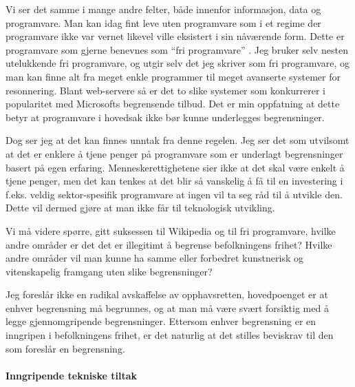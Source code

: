 \documentclass[11pt,norsk,a4paper]{article}
\begin{document}
Vi ser det samme i mange andre felter, både innenfor informasjon, data
og programvare. Man kan idag fint leve uten programvare som i et
regime der programvare ikke var vernet likevel ville eksistert i sin
nåværende form. Dette er programvare som gjerne benevnes som ``fri
programvare'' . Jeg bruker selv nesten utelukkende fri programvare, og
utgir selv det jeg skriver som fri programvare, og man kan finne alt
fra meget enkle programmer til meget avanserte systemer for
resonnering. Blant web-servere så er det to slike systemer som
konkurrerer i popularitet med Microsofts begrensende
tilbud\cite{netcraft}. Det er min oppfatning at dette betyr at
programvare i hovedsak ikke bør kunne underlegges begrensninger.

Dog ser jeg at det kan finnes unntak fra denne regelen. Jeg ser det
som utvilsomt at det er enklere å tjene penger på programvare som er
underlagt begrensninger basert på egen erfaring. Menneskerettighetene
sier ikke at det skal være enkelt å tjene penger, men det kan tenkes
at det blir så vanskelig å få til en investering i f.eks. veldig
sektor-spesifik programvare at ingen vil ta seg råd til å utvikle
den. Dette vil dermed gjøre at man ikke får til teknologisk utvikling.

Vi må videre spørre, gitt suksessen til Wikipedia og til fri
programvare, hvilke andre områder er det det er illegitimt å begrense
befolkningens frihet? Hvilke andre områder vil man kunne ha samme eller
forbedret kunstnerisk og vitenskapelig framgang uten slike begrensninger?

Jeg foreslår ikke en radikal avskaffelse av opphavsretten,
hovedpoenget er at enhver begrensning må begrunnes, og at man må være
svært forsiktig med å legge gjennomgripende begrensninger. Ettersom
enhver begrensning er en inngripen i befolkningens frihet, er det
naturlig at det stilles beviskrav til den som foreslår en begrensning.  

\paragraph{Inngripende tekniske tiltak}
\end{document}
